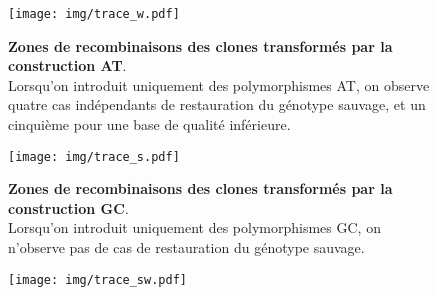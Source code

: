 \begin{figure}[p]%
  \begin{leftfullpage}
    \texttt{[image: img/trace\_w.pdf]}
    \caption[Zones de recombinaison des clones transformés par la construction
    AT]{\label{fig:tracew}\textbf{Zones de recombinaisons des clones transformés
        par la construction AT}. \\
      \rmfamily Lorsqu'on introduit uniquement des
      polymorphismes AT, on observe quatre cas indépendants de restauration du
      génotype sauvage, et un cinquième pour une base de qualité inférieure. }
  \end{leftfullpage}
\end{figure}
\begin{figure}[p]%
  \begin{fullpage}
    \texttt{[image: img/trace\_s.pdf]}
    \caption[Zones de recombinaisons des clones transformés par la construction
    GC]{\label{fig:traces} \textbf{Zones de recombinaisons des clones
        transformés par la construction GC}. \\
      \rmfamily Lorsqu'on introduit uniquement des polymorphismes GC, on n'observe pas de
      cas de restauration du génotype sauvage. }
  \end{fullpage}
\end{figure}
\begin{figure}[p]%
  \begin{leftfullpage}
    \texttt{[image: img/trace\_sw.pdf]}
    \caption[Zones de recombinaisons des clones transformés par la construction
    AT/GC]{\label{fig:tracesw} }
  \end{leftfullpage}
\end{figure}


